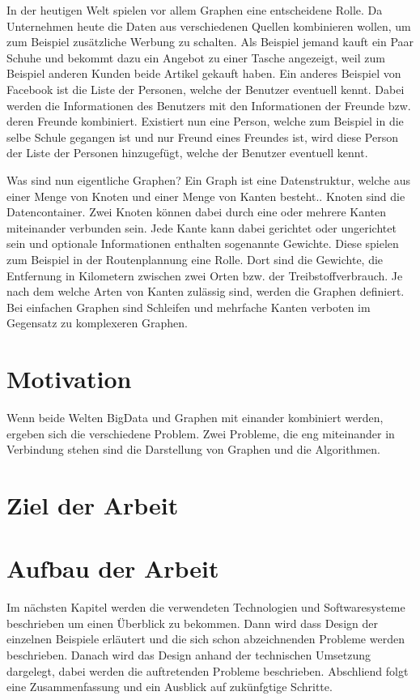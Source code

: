 In der heutigen Welt spielen vor allem Graphen eine entscheidene Rolle. Da 
Unternehmen heute die Daten aus verschiedenen Quellen kombinieren wollen, um zum
Beispiel zusätzliche Werbung zu schalten. Als Beispiel jemand kauft ein Paar
Schuhe und bekommt dazu ein Angebot zu einer Tasche angezeigt, weil zum
Beispiel anderen Kunden beide Artikel gekauft haben. Ein anderes Beispiel von
Facebook ist die Liste der Personen, welche der Benutzer eventuell kennt.
Dabei werden die Informationen des Benutzers mit den Informationen der Freunde
bzw. deren Freunde kombiniert. Existiert nun eine Person, welche zum Beispiel
in die selbe Schule gegangen ist und nur Freund eines Freundes ist, wird diese
Person der Liste der Personen hinzugefügt, welche der Benutzer eventuell kennt.

Was sind nun eigentliche Graphen? Ein Graph ist eine Datenstruktur, welche aus
einer Menge von Knoten und einer Menge von Kanten besteht.. Knoten sind die
Datencontainer. Zwei Knoten können dabei durch eine oder mehrere Kanten miteinander
verbunden sein. Jede Kante kann dabei gerichtet oder ungerichtet sein und
optionale Informationen enthalten sogenannte Gewichte. Diese spielen zum Beispiel
in der Routenplannung eine Rolle. Dort sind die Gewichte, die Entfernung in
Kilometern zwischen zwei Orten bzw. der Treibstoffverbrauch. Je nach dem welche
Arten von Kanten zulässig sind, werden die Graphen definiert. Bei einfachen
Graphen sind Schleifen und mehrfache Kanten verboten im Gegensatz zu komplexeren
Graphen.

\section{Motivation}
Wenn beide Welten BigData und Graphen mit einander kombiniert werden, ergeben
sich die verschiedene Problem. Zwei Probleme, die eng miteinander in Verbindung
stehen sind die Darstellung von Graphen und die Algorithmen.


\section{Ziel der Arbeit}

\section{Aufbau der Arbeit}
Im nächsten Kapitel werden die verwendeten Technologien und Softwaresysteme
beschrieben um einen Überblick zu bekommen. Dann wird dass Design der einzelnen
Beispiele erläutert und die sich schon abzeichnenden Probleme werden beschrieben.
Danach wird das Design anhand der technischen Umsetzung dargelegt, dabei werden
die auftretenden Probleme beschrieben. Abschliend folgt eine Zusammenfassung und
ein Ausblick auf zukünfgtige Schritte.
